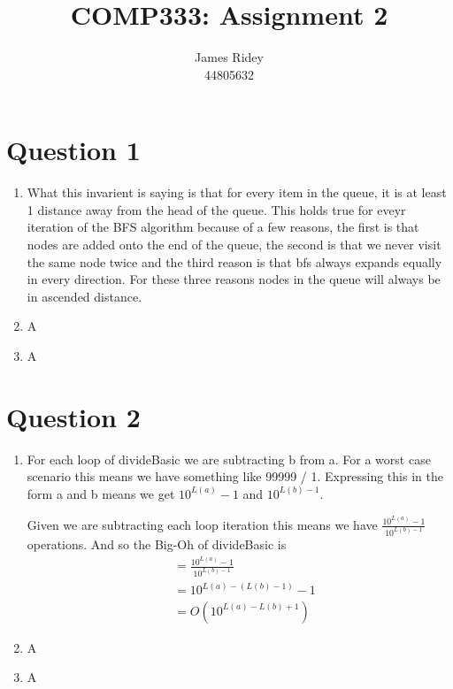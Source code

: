 \documentclass[journal,a4paper]{IEEEtran}
\begin{document}
\onecolumn

\title{COMP333: Assignment 2}
\author{James Ridey\\
44805632}
\maketitle



\lstset{escapechar=@,style=customc}

\section*{Question 1}
\begin{enumerate}
	\item What this invarient is saying is that for every item in the queue, it is at least 1 distance away from the head of the queue. This holds true for eveyr iteration of the BFS algorithm because of a few reasons, the first is that nodes are added onto the end of the queue, the second is that we never visit the same node twice and the third reason is that bfs always expands equally in every direction. For these three reasons nodes in the queue will always be in ascended distance.
	\item A
	\item A
\end{enumerate}

\section*{Question 2}
\begin{enumerate}
	\item For each loop of divideBasic we are subtracting b from a. For a worst case scenario this means we have something like 99999 / 1. Expressing this in the form a and b means we get $10^{L(a)}-1$ and $10^{L(b)-1}$. 

Given we are subtracting each loop iteration this means we have $\frac{10^{L(a)}-1}{10^{L(b)-1}}$ operations. And so the Big-Oh of divideBasic is 
	\begin{align*}
		&= \frac{10^{L(a)}-1}{10^{L(b)-1}} \\
		&= 10^{L(a)-(L(b)-1)} - 1 \\
		&= O(10^{L(a)-L(b)+1})
	\end{align*}
	\item A
	\item A
\end{enumerate}
\end{document}
